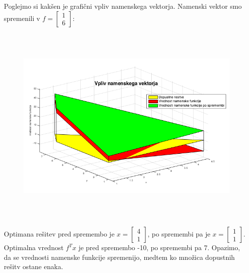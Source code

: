 \documentclass[a4paper,12pt]{article}
\begin{document}
\clearpage

Poglejmo si kakšen je grafični vpliv namenskega vektorja. Namenski vektor smo spremenili v $f=\begin{bmatrix} 1 \\ 6\end{bmatrix}$:

\begin{figure}[h!]
\includegraphics[width=15cm,height=10cm]{viz2.png}
\centering
\end{figure}

Optimana rešitev pred spremembo je $x=\begin{bmatrix} 4\\ 1\end{bmatrix}$, po spremembi pa je $x=\begin{bmatrix} 1 \\ 1 \end{bmatrix}$. Optimalna vrednost $f^Tx$ je pred spremembo -10, po spremembi pa 7.
Opazimo, da se vrednosti namenske funkcije spremenijo, medtem ko množica dopustnih rešitv ostane enaka.
\end{document}
